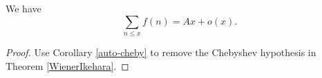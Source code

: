 \begin{theorem}
\label{WienerIkehara2}
\leanok
We have $$ \sum_{n\leq x} f(n) = A x + o(x).$$
\end{theorem}
\begin{proof}
\leanok
Use Corollary \ref{auto-cheby} to remove the Chebyshev hypothesis in Theorem \ref{WienerIkehara}.
\end{proof}
